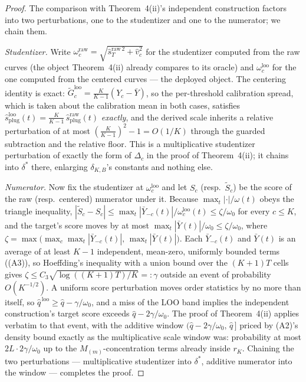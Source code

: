 \documentclass[12pt]{article}
\theoremstyle{definition}
\theoremstyle{remark}
\begin{document}
\begin{proof}
The comparison with Theorem~4(ii)'s independent construction factors into
two perturbations, one to the studentizer and one to the numerator; we chain
them.

\emph{Studentizer.} Write $\omega^{\text{raw}}_c=\sqrt{\widehat
s_T^{\text{raw}\,2}+\widehat v_c^2}$ for the studentizer computed from the
raw curves (the object Theorem~4(ii) already compares to its oracle) and
$\omega^{\text{loo}}_c$ for the one computed from the centered curves ---
the deployed object. The centering identity is exact:
$\widetilde G^{\text{loo}}_c=\tfrac{K}{K-1}(Y_c-\bar Y)$, so the
per-threshold calibration spread, which is taken about the calibration mean
in both cases, satisfies $\widehat s^{\text{loo}}_{\text{plug}}(t)
=\tfrac{K}{K-1}\,\widehat s^{\text{raw}}_{\text{plug}}(t)$ \emph{exactly},
and the derived scale inherits a relative perturbation of at most
$(\tfrac{K}{K-1})^2-1=O(1/K)$ through the guarded subtraction and the
relative floor. This is a multiplicative studentizer perturbation of
exactly the form of $\Delta_c$ in the proof of Theorem~4(ii); it chains
into $\delta^*$ there, enlarging $\delta_{K,B}$'s constants and nothing
else.

\emph{Numerator.} Now fix the studentizer at $\omega^{\text{loo}}_c$ and
let $S_c$ (resp.\ $\widetilde S_c$) be the score of the raw (resp.\
centered) numerator under it. Because $\max_t|\cdot|/\omega(t)$ obeys
the triangle inequality,
$|\widetilde S_c-S_c|\le\max_t|\bar Y_{-c}(t)|/\omega^{\text{loo}}_c(t)
\le\zeta/\omega_0$
for every $c\le K$, and the target's score moves by at most
$\max_t|\bar Y(t)|/\omega_0\le\zeta/\omega_0$, where
$\zeta=\max\big(\max_c\max_t|\bar Y_{-c}(t)|,\,\max_t|\bar Y(t)|\big)$.
Each $\bar Y_{-c}(t)$ and $\bar Y(t)$ is an average of at least $K-1$
independent, mean-zero, uniformly bounded terms ((A3)), so Hoeffding's
inequality with a union bound over the $(K{+}1)T$ cells gives
$\zeta\le C_3\sqrt{\log((K{+}1)T)/K}=:\gamma$ outside an event of
probability $O(K^{-1/2})$. A uniform score perturbation moves order
statistics by no more than itself, so
$\widehat q^{\,\text{loo}}\ge\widehat q-\gamma/\omega_0$, and a miss of the
LOO band implies the independent construction's target score exceeds
$\widehat q-2\gamma/\omega_0$. The proof of Theorem~4(ii) applies
verbatim to that event, with the additive window
$(\widehat q-2\gamma/\omega_0,\,\widehat q\,]$ priced by (A2)'s density
bound exactly as the multiplicative scale window was: probability at most
$2L\cdot2\gamma/\omega_0$ up to the $M_{(m)}$-concentration terms already
inside $r_K$. Chaining the two perturbations --- multiplicative
studentizer into $\delta^*$, additive numerator into the window ---
completes the proof.
\end{proof}
\end{document}
